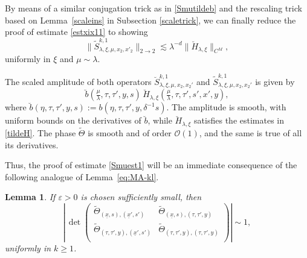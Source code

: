 \documentclass[leqno]{amsart}
\newtheorem{lemma}[theorem]{Lemma}
\theoremstyle{definition}
\theoremstyle{remark}
\numberwithin{equation}{section}
\newcommand\la{{\lambda}}
\newcommand\ve{{\varepsilon}}
\begin{document}
By means of a similar conjugation trick  as in \eqref{Smutildeb} and the   rescaling trick based on Lemma~\ref{scaleins} in Subsection \ref{scaletrick}, we can finally reduce the proof of estimate \eqref{estxix11} to showing
\begin{equation}\label{Smuest1}
\|\tilde S_{\lambda,\xi,\mu,x_2,x'_2}^{k,1} \|_{2\to 2}  \lesssim \lambda^{-d}  \|\breve H_{\la,\xi}\|_{C^M},
\end{equation}
uniformly in $\xi$ and $\mu\sim \lambda$.

The scaled amplitude of both operators $\breve S_{\lambda,\xi,\mu,x_2,x_2'}^{k,1}$ and
$\tilde S_{\lambda,\xi,\mu,x_2,x_2'}^{k,1}$ is given by
\[
\breve b(\tfrac\mu\la,\tau,\tau',y,s)\,
\breve H_{\la,\xi}(\tfrac\mu\la,\tau,\tau',s',x',y),
\]
where $\breve b(\eta,\tau,\tau',y,s):=b(\eta,\tau,\tau',y,\delta^{-1}s)$. The amplitude is smooth, with uniform bounds on the derivatives of
$\breve b$, while $\breve H_{\la,\xi}$ satisfies the estimates in \eqref{tildeH}. The phase $\tilde\Theta$ is smooth and of order $\mathcal O(1)$, and the same is true of all its derivatives.

Thus, the proof of estimate \eqref{Smuest1} will be an immediate consequence of the following analogue of Lemma~\ref{eq:MA-kl}.

\begin{lemma}\label{eq:MA-k1}
If $\ve>0$ is chosen sufficiently small, then
\[
\left|
\,\det
\begin{pmatrix}
\tilde\Theta_{(\underline x,s),(\underline x',s')} & \tilde\Theta_{(\underline x,s),(\tau,\tau',y)}\\
\tilde\Theta_{(\tau,\tau',y),(\underline x',s')} & \tilde\Theta_{(\tau,\tau',y),(\tau,\tau',y)}\\
\end{pmatrix}
\right|
\sim 1,
\]
uniformly in $k\ge1$.
\end{lemma}
\end{document}
